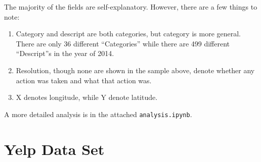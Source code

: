 \documentclass{article}
\begin{document}
The majority of the fields are self-explanatory. However, there are a few
things to note:
\begin{enumerate}
\item Category and descript are both categories, but category is more
  general. There are only 36 different ``Categories'' while there are 499
  different ``Descript''s in the year of 2014.
\item Resolution, though none are shown in the sample above, denote whether
  any action was taken and what that action was.
\item X denotes longitude, while Y denote latitude.
\end{enumerate}

A more detailed analysis is in the attached \texttt{analysis.ipynb}.

\section{Yelp Data Set}
\end{document}
